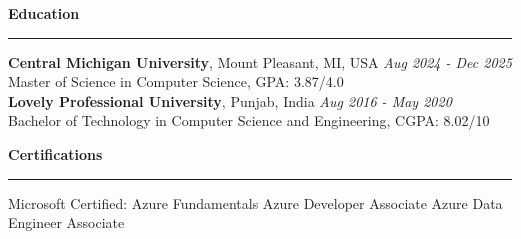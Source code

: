 \documentclass[11pt,letterpaper]{article}
\newcommand{\ressection}[1]{\Needspace{6\baselineskip}\vspace{8pt}\par\textbf{#1}\par\vspace{2pt}\hrule\vspace{5pt}}
\begin{document}
\ressection{Education}
\textbf{Central Michigan University}, Mount Pleasant, MI, USA \hfill \textit{Aug 2024 - Dec 2025}\\
Master of Science in Computer Science, GPA: 3.87/4.0\\[2pt]
\textbf{Lovely Professional University}, Punjab, India \hfill \textit{Aug 2016 - May 2020}\\
Bachelor of Technology in Computer Science and Engineering, CGPA: 8.02/10

\ressection{Certifications}
Microsoft Certified: Azure Fundamentals \textbar{} Azure Developer Associate \textbar{} Azure Data Engineer Associate
\end{document}
